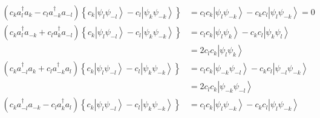 \documentclass[aps,preprint]{revtex4}%
\begin{document}
\begin{align}
\left(  c_{k}a_{l}^{\dagger}a_{k}-c_{l}a_{-k}^{\dagger}a_{-l}\right)  \left\{
c_{k}\left\vert \psi_{l}\psi_{-l}\right\rangle -c_{l}\left\vert \psi_{k}%
\psi_{-k}\right\rangle \right\}   &  =c_{l}c_{k}\left\vert \psi_{l}\psi
_{-k}\right\rangle -c_{k}c_{l}\left\vert \psi_{l}\psi_{-k}\right\rangle =0\\
\left(  c_{k}a_{l}^{\dagger}a_{-k}+c_{l}a_{k}^{\dagger}a_{-l}\right)  \left\{
c_{k}\left\vert \psi_{l}\psi_{-l}\right\rangle -c_{l}\left\vert \psi_{k}%
\psi_{-k}\right\rangle \right\}   &  =c_{l}c_{k}\left\vert \psi_{l}\psi
_{k}\right\rangle -c_{k}c_{l}\left\vert \psi_{k}\psi_{l}\right\rangle \\
&  =2c_{l}c_{k}\left\vert \psi_{l}\psi_{k}\right\rangle \\
\left(  c_{k}a_{-l}^{\dagger}a_{k}+c_{l}a_{-k}^{\dagger}a_{l}\right)  \left\{
c_{k}\left\vert \psi_{l}\psi_{-l}\right\rangle -c_{l}\left\vert \psi_{k}%
\psi_{-k}\right\rangle \right\}   &  =c_{l}c_{k}\left\vert \psi_{-k}\psi
_{-l}\right\rangle -c_{k}c_{l}\left\vert \psi_{-l}\psi_{-k}\right\rangle \\
&  =2c_{l}c_{k}\left\vert \psi_{-k}\psi_{-l}\right\rangle \\
\left(  c_{k}a_{-l}^{\dagger}a_{-k}-c_{l}a_{k}^{\dagger}a_{l}\right)  \left\{
c_{k}\left\vert \psi_{l}\psi_{-l}\right\rangle -c_{l}\left\vert \psi_{k}%
\psi_{-k}\right\rangle \right\}   &  =c_{l}c_{k}\left\vert \psi_{l}\psi
_{-k}\right\rangle -c_{k}c_{l}\left\vert \psi_{l}\psi_{-k}\right\rangle
\end{align}


\bigskip%
\end{document}
